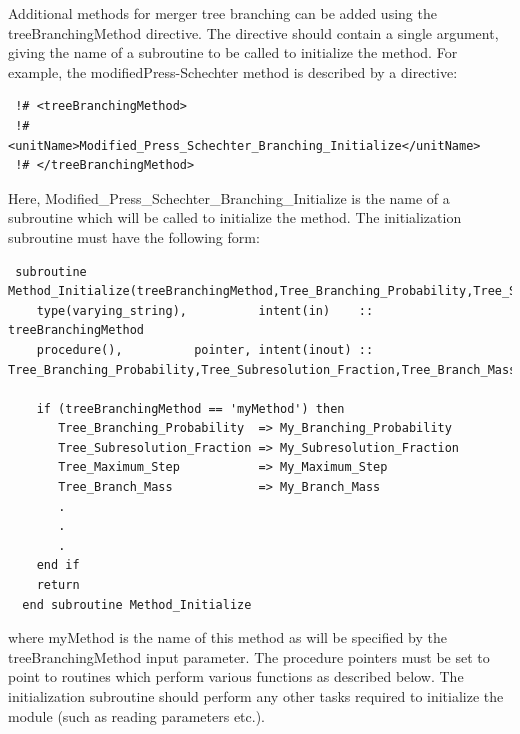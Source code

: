 Additional methods for merger tree branching can be added using the {\normalfont \ttfamily treeBranchingMethod} directive. The directive should contain a single argument, giving the name of a subroutine to be called to initialize the method. For example, the {\normalfont \ttfamily modifiedPress-Schechter} method is described by a directive:
\begin{verbatim}
 !# <treeBranchingMethod>
 !#  <unitName>Modified_Press_Schechter_Branching_Initialize</unitName>
 !# </treeBranchingMethod>
\end{verbatim}
Here, {\normalfont \ttfamily Modified\_Press\_Schechter\_Branching\_Initialize} is the name of a subroutine which will be called to initialize the method. The initialization subroutine must have the following form:
\begin{verbatim}
 subroutine Method_Initialize(treeBranchingMethod,Tree_Branching_Probability,Tree_Subresolution_Fraction,Tree_Branch_Mass,Tree_Maximum_Step)
    type(varying_string),          intent(in)    :: treeBranchingMethod
    procedure(),          pointer, intent(inout) :: Tree_Branching_Probability,Tree_Subresolution_Fraction,Tree_Branch_Mass,Tree_Maximum_Step
    
    if (treeBranchingMethod == 'myMethod') then
       Tree_Branching_Probability  => My_Branching_Probability
       Tree_Subresolution_Fraction => My_Subresolution_Fraction
       Tree_Maximum_Step           => My_Maximum_Step
       Tree_Branch_Mass            => My_Branch_Mass
       .
       .
       .
    end if
    return
  end subroutine Method_Initialize
\end{verbatim}
where {\normalfont \ttfamily myMethod} is the name of this method as will be specified by the {\normalfont \ttfamily treeBranchingMethod} input parameter. The procedure pointers must be set to point to routines which perform various functions as described below. The initialization subroutine should perform any other tasks required to initialize the module (such as reading parameters etc.).

